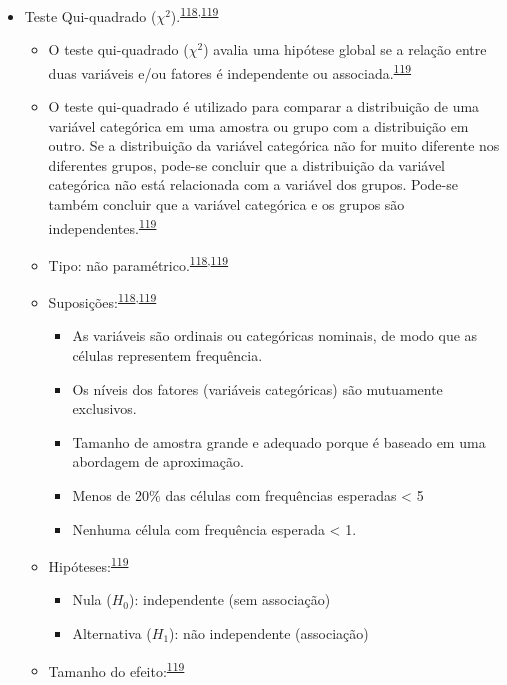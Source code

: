\documentclass[
]{book}
\begin{document}
\begin{itemize}
\item
  Teste Qui-quadrado (\(\chi^2\)).\textsuperscript{\protect\hyperlink{ref-McHugh2013}{118},\protect\hyperlink{ref-Kim2017a}{119}}

  \begin{itemize}
  \item
    O teste qui-quadrado (\(\chi^2\)) avalia uma hipótese global se a relação entre duas variáveis e/ou fatores é independente ou associada.\textsuperscript{\protect\hyperlink{ref-Kim2017a}{119}}
  \item
    O teste qui-quadrado é utilizado para comparar a distribuição de uma variável categórica em uma amostra ou grupo com a distribuição em outro. Se a distribuição da variável categórica não for muito diferente nos diferentes grupos, pode-se concluir que a distribuição da variável categórica não está relacionada com a variável dos grupos. Pode-se também concluir que a variável categórica e os grupos são independentes.\textsuperscript{\protect\hyperlink{ref-Kim2017a}{119}}
  \item
    Tipo: não paramétrico.\textsuperscript{\protect\hyperlink{ref-McHugh2013}{118},\protect\hyperlink{ref-Kim2017a}{119}}
  \item
    Suposições:\textsuperscript{\protect\hyperlink{ref-McHugh2013}{118},\protect\hyperlink{ref-Kim2017a}{119}}

    \begin{itemize}
    \item
      As variáveis são ordinais ou categóricas nominais, de modo que as células representem frequência.
    \item
      Os níveis dos fatores (variáveis categóricas) são mutuamente exclusivos.
    \item
      Tamanho de amostra grande e adequado porque é baseado em uma abordagem de aproximação.
    \item
      Menos de 20\% das células com frequências esperadas \textless{} 5
    \item
      Nenhuma célula com frequência esperada \textless{} 1.
    \end{itemize}
  \item
    Hipóteses:\textsuperscript{\protect\hyperlink{ref-Kim2017a}{119}}

    \begin{itemize}
    \item
      Nula (\(H_{0}\)): independente (sem associação)
    \item
      Alternativa (\(H_{1}\)): não independente (associação)
    \end{itemize}
  \item
    Tamanho do efeito:\textsuperscript{\protect\hyperlink{ref-Kim2017a}{119}}


\end{itemize}
\end{itemize}
\end{document}
